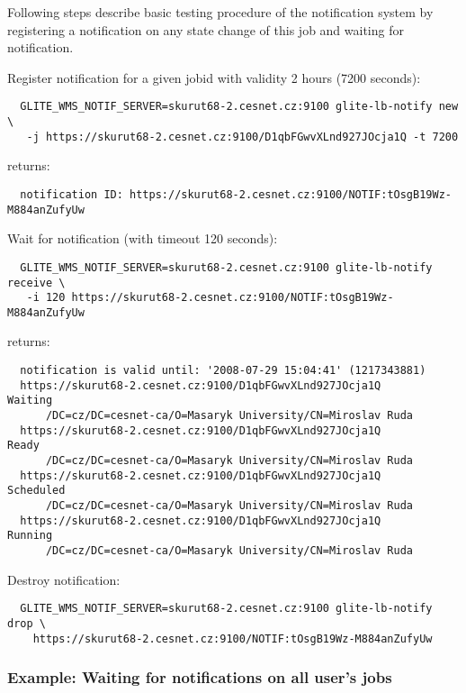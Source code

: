 Following steps describe basic testing procedure of the notification
system by registering a notification on any state change of this job
and waiting for notification.

Register notification for a given jobid
with validity 2 hours (7200 seconds):

\begin{verbatim}
  GLITE_WMS_NOTIF_SERVER=skurut68-2.cesnet.cz:9100 glite-lb-notify new \
   -j https://skurut68-2.cesnet.cz:9100/D1qbFGwvXLnd927JOcja1Q -t 7200
\end{verbatim}

returns:

\begin{verbatim}
  notification ID: https://skurut68-2.cesnet.cz:9100/NOTIF:tOsgB19Wz-M884anZufyUw 
\end{verbatim}


Wait for notification (with timeout 120 seconds):
\begin{verbatim}
  GLITE_WMS_NOTIF_SERVER=skurut68-2.cesnet.cz:9100 glite-lb-notify receive \
   -i 120 https://skurut68-2.cesnet.cz:9100/NOTIF:tOsgB19Wz-M884anZufyUw 
\end{verbatim}

returns:
\begin{verbatim}
  notification is valid until: '2008-07-29 15:04:41' (1217343881)
  https://skurut68-2.cesnet.cz:9100/D1qbFGwvXLnd927JOcja1Q        Waiting
      /DC=cz/DC=cesnet-ca/O=Masaryk University/CN=Miroslav Ruda
  https://skurut68-2.cesnet.cz:9100/D1qbFGwvXLnd927JOcja1Q        Ready
      /DC=cz/DC=cesnet-ca/O=Masaryk University/CN=Miroslav Ruda
  https://skurut68-2.cesnet.cz:9100/D1qbFGwvXLnd927JOcja1Q        Scheduled
      /DC=cz/DC=cesnet-ca/O=Masaryk University/CN=Miroslav Ruda
  https://skurut68-2.cesnet.cz:9100/D1qbFGwvXLnd927JOcja1Q        Running
      /DC=cz/DC=cesnet-ca/O=Masaryk University/CN=Miroslav Ruda
\end{verbatim}

Destroy notification:
\begin{verbatim}
  GLITE_WMS_NOTIF_SERVER=skurut68-2.cesnet.cz:9100 glite-lb-notify drop \
    https://skurut68-2.cesnet.cz:9100/NOTIF:tOsgB19Wz-M884anZufyUw
\end{verbatim}

\subsubsection{Example: Waiting for notifications on all user's jobs}


